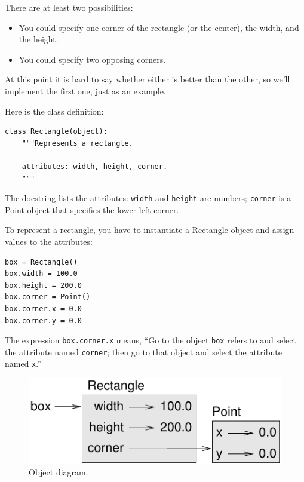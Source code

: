 \documentclass[12pt,a4paper,final,twoside,onecolumn,titlepage]{book}
\begin{document}
There are at least two possibilities: 

\begin{itemize}

\item You could specify one corner of the rectangle
(or the center), the width, and the height.

\item You could specify two opposing corners.

\end{itemize}

At this point it is hard to say whether either is better than
the other, so we'll implement the first one, just as an example.

Here is the class definition:

\begin{verbatim}
class Rectangle(object):
    """Represents a rectangle. 

    attributes: width, height, corner.
    """
\end{verbatim}
%
The docstring lists the attributes:  {\tt width} and
{\tt height} are numbers; {\tt corner} is a Point object that
specifies the lower-left corner.

To represent a rectangle, you have to instantiate a Rectangle
object and assign values to the attributes:

\begin{verbatim}
box = Rectangle()
box.width = 100.0
box.height = 200.0
box.corner = Point()
box.corner.x = 0.0
box.corner.y = 0.0
\end{verbatim}
%
The expression {\tt box.corner.x} means,
``Go to the object {\tt box} refers to and select the attribute named
{\tt corner}; then go to that object and select the attribute named
{\tt x}.''

\begin{figure}
\centerline
{\includegraphics[scale=0.8]{figs/rectangle.pdf}}
\caption{Object diagram.}
\label{fig.rectangle}
\end{figure}
\end{document}
